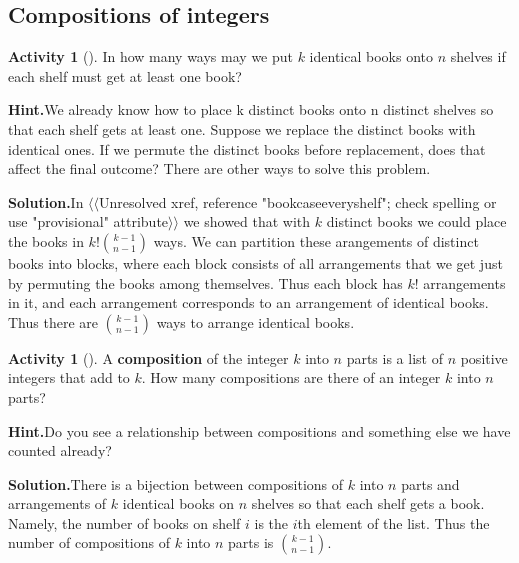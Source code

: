 \documentclass[10pt,]{book}
\newcommand{\terminology}[1]{\textbf{#1}}
\theoremstyle{plain}
\theoremstyle{definition}
\newtheorem{activity}[project]{Activity}
\numberwithin{equation}{chapter}
\begin{document}
\subsection[{Compositions of integers}]{Compositions of integers}\label{subsection-31}
\begin{activity}[]\label{activity-119}
In how many ways may we put \(k\) identical books onto \(n\) shelves if each shelf must get at least one book?%
\par\medskip\noindent%
\textbf{Hint.}\quad We already know how to place k distinct books onto n distinct shelves so that each shelf gets at least one. Suppose we replace the distinct books with identical ones. If we permute the distinct books before replacement, does that affect the final outcome? There are other ways to solve this problem.%
\par\medskip\noindent%
\textbf{Solution.}\quad In {$\langle\langle$Unresolved xref, reference "bookcaseeveryshelf"; check spelling or use "provisional" attribute$\rangle\rangle$} we showed that with \(k\) distinct books we could place the books in \(k!\binom{k-1}{n-1}\) ways. We can partition these arangements of distinct books into blocks, where each block consists of all arrangements that we get just by permuting the books among themselves. Thus each block has \(k!\) arrangements in it, and each arrangement corresponds to an arrangement of identical books. Thus there are \(\binom{k-1}{n-1}\) ways to arrange identical books.%
\end{activity}
\begin{activity}[]\label{compositionagian}
A \terminology{composition} of the integer \(k\) into \(n\) parts is a list of \(n\) positive integers that add to \(k\).  How many compositions are there of an integer \(k\) into \(n\) parts?%
\par\medskip\noindent%
\textbf{Hint.}\quad Do you see a relationship between compositions and something else we have counted already?%
\par\medskip\noindent%
\textbf{Solution.}\quad There is a bijection between compositions of \(k\) into \(n\) parts and arrangements of \(k\) identical books on \(n\) shelves so that each shelf gets a book. Namely, the number of books on shelf \(i\) is the \(i\)th element of the list. Thus the number of compositions of \(k\) into \(n\) parts is \(\binom{k-1}{n-1}\).%
\end{activity}
\end{document}
